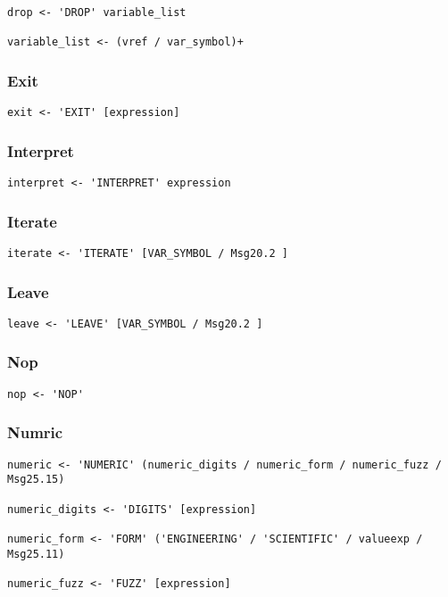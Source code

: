 \begin{verbatim}
drop <- 'DROP' variable_list

variable_list <- (vref / var_symbol)+
\end{verbatim}

\subsubsection{Exit}

\begin{verbatim}
exit <- 'EXIT' [expression]
\end{verbatim}

\subsubsection{Interpret}

\begin{verbatim}
interpret <- 'INTERPRET' expression
\end{verbatim}

\subsubsection{Iterate}

\begin{verbatim}
iterate <- 'ITERATE' [VAR_SYMBOL / Msg20.2 ]
\end{verbatim}

\subsubsection{Leave}

\begin{verbatim}
leave <- 'LEAVE' [VAR_SYMBOL / Msg20.2 ]
\end{verbatim}

\subsubsection{Nop}

\begin{verbatim}
nop <- 'NOP'
\end{verbatim}

\subsubsection{Numric}

\begin{verbatim}
numeric <- 'NUMERIC' (numeric_digits / numeric_form / numeric_fuzz / Msg25.15)

numeric_digits <- 'DIGITS' [expression]

numeric_form <- 'FORM' ('ENGINEERING' / 'SCIENTIFIC' / valueexp / Msg25.11)

numeric_fuzz <- 'FUZZ' [expression]
\end{verbatim}

